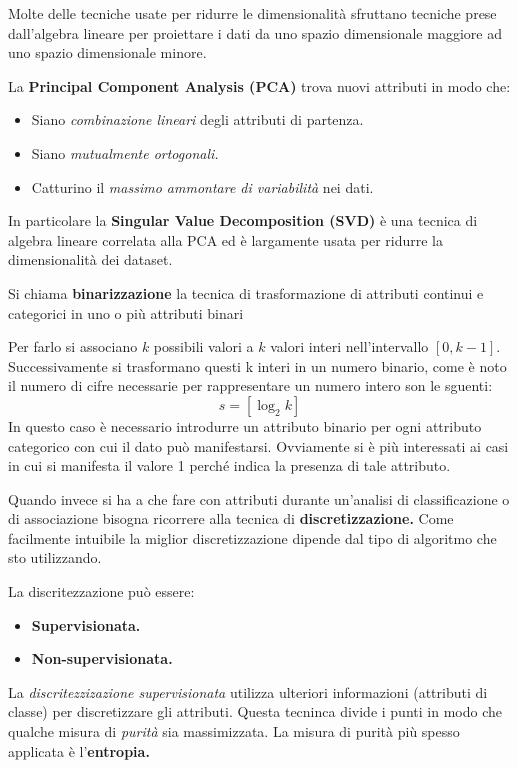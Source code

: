 Molte delle tecniche usate per ridurre le dimensionalità sfruttano tecniche prese dall'algebra lineare per proiettare i dati da uno spazio dimensionale maggiore ad uno spazio dimensionale minore.

La \textbf{Principal Component Analysis (PCA)} trova nuovi attributi in modo che:
\begin{itemize}
	\item Siano \textit{combinazione lineari} degli attributi di partenza.
	\item Siano \textit{mutualmente ortogonali.}
	\item Catturino il \textit{massimo ammontare di variabilità} nei dati.
\end{itemize}

In particolare la \textbf{Singular Value Decomposition (SVD)} è una tecnica di algebra lineare correlata alla PCA ed è largamente usata per ridurre la dimensionalità dei dataset.

\begin{defn}
	Si chiama \textbf{binarizzazione} la tecnica di trasformazione di attributi continui e categorici in uno o più attributi binari
\end{defn}
Per farlo si associano $k$ possibili valori a $k$ valori interi nell'intervallo $[0, k-1]$. Successivamente si trasformano questi k interi in un numero binario, come è noto il numero di cifre necessarie per rappresentare un numero intero son le sguenti:
\[s = [\log_{2}k]\] 
 In questo caso è necessario introdurre un attributo binario per ogni attributo categorico con cui il dato può manifestarsi. Ovviamente si è più interessati ai casi in cui si manifesta il valore 1 perché indica la presenza di tale attributo.
 
 Quando invece si ha a che fare con attributi durante un'analisi di classificazione o di associazione bisogna ricorrere alla tecnica di \textbf{discretizzazione.} Come facilmente intuibile la miglior discretizzazione dipende dal tipo di algoritmo che sto utilizzando.

 La discritezzazione può essere:
 
 \begin{itemize}
 	\item \textbf{Supervisionata.}
 	\item \textbf{Non-supervisionata.}
 \end{itemize}
La \textit{discritezzizazione supervisionata} utilizza ulteriori informazioni (attributi di classe) per discretizzare gli attributi. Questa tecninca divide i punti in modo che qualche misura di \textit{purità} sia massimizzata. La misura di purità più spesso applicata è l'\textbf{entropia.}
 	
